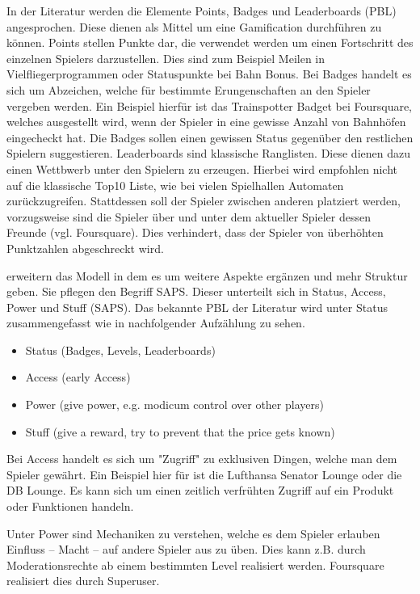 In der Literatur werden die Elemente Points, Badges und Leaderboards (PBL) angesprochen. Diese dienen als Mittel um eine Gamification durchführen zu können. 
Points stellen Punkte dar, die verwendet werden um einen Fortschritt des einzelnen Spielers darzustellen. Dies sind zum Beispiel Meilen in Vielfliegerprogrammen oder Statuspunkte bei Bahn Bonus.
Bei Badges handelt es sich um Abzeichen, welche für bestimmte Erungenschaften an den Spieler vergeben werden. Ein Beispiel hierfür ist das Trainspotter Badget bei Foursquare, welches ausgestellt wird, wenn der Spieler in eine gewisse Anzahl von Bahnhöfen eingecheckt hat. Die Badges sollen einen gewissen Status gegenüber den restlichen Spielern suggestieren.
Leaderboards sind klassische Ranglisten. Diese dienen dazu einen Wettbwerb unter den Spielern zu erzeugen. Hierbei wird empfohlen nicht auf die klassische Top10 Liste, wie bei vielen Spielhallen Automaten zurückzugreifen. Stattdessen soll der Spieler zwischen anderen platziert werden, vorzugsweise sind die Spieler über und unter dem aktueller Spieler dessen Freunde (vgl. Foursquare). Dies verhindert, dass der Spieler von überhöhten Punktzahlen abgeschreckt wird.

\cite{Zichermann.2011} erweitern das Modell in dem es um weitere Aspekte ergänzen und mehr Struktur geben.
Sie pflegen den Begriff SAPS. Dieser unterteilt sich in Status, Access, Power und Stuff (SAPS).
Das bekannte PBL der Literatur wird unter Status zusammengefasst wie in nachfolgender Aufzählung zu sehen.

\begin{itemize}
\item Status (Badges, Levels, Leaderboards)
\item Access (early Access)
\item Power (give power, e.g. modicum control over other players)
\item Stuff (give a reward, try to prevent that the price gets known)
\end{itemize}

Bei Access handelt es sich um "Zugriff" zu exklusiven Dingen, welche man dem Spieler gewährt. Ein Beispiel hier für ist die Lufthansa Senator Lounge oder die DB Lounge.
Es kann sich um einen zeitlich verfrühten Zugriff auf ein Produkt oder Funktionen handeln.

Unter Power sind Mechaniken zu verstehen, welche es dem Spieler erlauben Einfluss -- Macht -- auf andere Spieler aus zu üben. Dies kann z.B. durch Moderationsrechte ab einem bestimmten Level realisiert werden. Foursquare realisiert dies durch Superuser.

